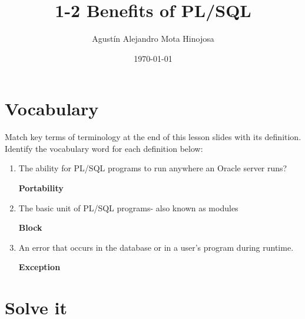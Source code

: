 \documentclass[11pt]{article}
\author{Agustín Alejandro Mota Hinojosa}
\date{\today}
\title{1-2 Benefits of PL/SQL}
\begin{document}
\maketitle
\tableofcontents

\section*{Vocabulary}
\label{sec:org2071523}

Match key terms of terminology at the end of this lesson slides with its definition.
Identify the vocabulary word for each definition below:

\begin{enumerate}
\item The ability for PL/SQL programs to run anywhere an Oracle server runs?

\textbf{Portability}

\item The basic unit of PL/SQL programs- also known as modules

\textbf{Block}

\item An error that occurs in the database or in a user’s program during runtime.

\textbf{Exception}
\end{enumerate}
\section*{Solve it}
\label{sec:orgcee713a}
\end{document}
